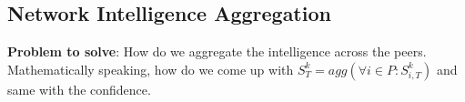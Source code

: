\subsection{Network Intelligence Aggregation}
\textbf{Problem to solve}: How do we aggregate the intelligence across the peers. Mathematically speaking, how do we come up with $S^{k}_{T} = agg(\forall {i} \in P: S^{k}_{i, T})$ and same with the confidence.